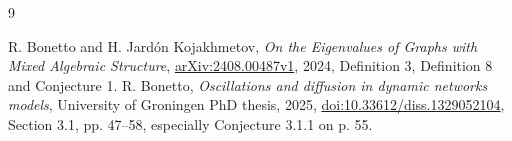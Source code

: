 \documentclass[11pt]{article}
\begin{document}
\begin{thebibliography}{9}
\raggedright
{} R. Bonetto and H. Jard\'on Kojakhmetov,
\emph{On the Eigenvalues of Graphs with Mixed Algebraic Structure},
\href{https://arxiv.org/abs/2408.00487}{arXiv:2408.00487v1}, 2024,
Definition 3, Definition 8 and Conjecture 1.
 R. Bonetto,
\emph{Oscillations and diffusion in dynamic networks models},
University of Groningen PhD thesis, 2025,
\href{https://doi.org/10.33612/diss.1329052104}{doi:10.33612/diss.1329052104},
Section 3.1, pp. 47--58, especially Conjecture 3.1.1 on p. 55.
\end{thebibliography}
\end{document}
